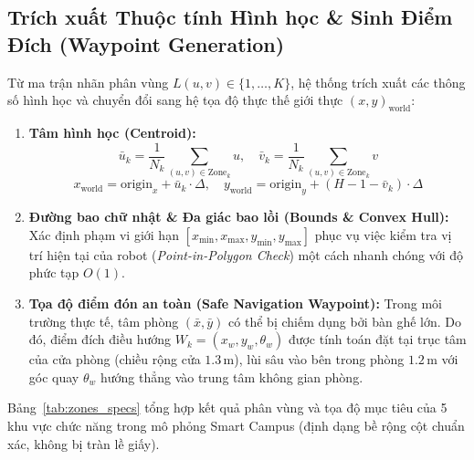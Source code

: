 \subsection{Trích xuất Thuộc tính Hình học & Sinh Điểm Đích (Waypoint Generation)}

Từ ma trận nhãn phân vùng $L(u, v) \in \{1, \dots, K\}$, hệ thống trích xuất các thông số hình học và chuyển đổi sang hệ tọa độ thực thế giới thực $(x, y)_{\text{world}}$:

\begin{enumerate}
    \item \textbf{Tâm hình học (Centroid):}
    \begin{equation}
    \bar{u}_k = \frac{1}{N_k} \sum_{(u, v) \in \text{Zone}_k} u, \quad \bar{v}_k = \frac{1}{N_k} \sum_{(u, v) \in \text{Zone}_k} v
    \end{equation}
    \begin{equation}
    x_{\text{world}} = \text{origin}_x + \bar{u}_k \cdot \Delta, \quad y_{\text{world}} = \text{origin}_y + (H - 1 - \bar{v}_k) \cdot \Delta
    \end{equation}
    
    \item \textbf{Đường bao chữ nhật & Đa giác bao lồi (Bounds & Convex Hull):}
    Xác định phạm vi giới hạn $[x_{\min}, x_{\max}, y_{\min}, y_{\max}]$ phục vụ việc kiểm tra vị trí hiện tại của robot (\textit{Point-in-Polygon Check}) một cách nhanh chóng với độ phức tạp $O(1)$.
    
    \item \textbf{Tọa độ điểm đón an toàn (Safe Navigation Waypoint):}
    Trong môi trường thực tế, tâm phòng $(\bar{x}, \bar{y})$ có thể bị chiếm dụng bởi bàn ghế lớn. Do đó, điểm đích điều hướng $W_k = (x_w, y_w, \theta_w)$ được tính toán đặt tại trục tâm của cửa phòng (chiều rộng cửa $1.3\,\text{m}$), lùi sâu vào bên trong phòng $1.2\,\text{m}$ với góc quay $\theta_w$ hướng thẳng vào trung tâm không gian phòng.
\end{enumerate}

Bảng~\ref{tab:zones_specs} tổng hợp kết quả phân vùng và tọa độ mục tiêu của 5 khu vực chức năng trong mô phỏng Smart Campus (định dạng bề rộng cột chuẩn xác, không bị tràn lề giấy).


